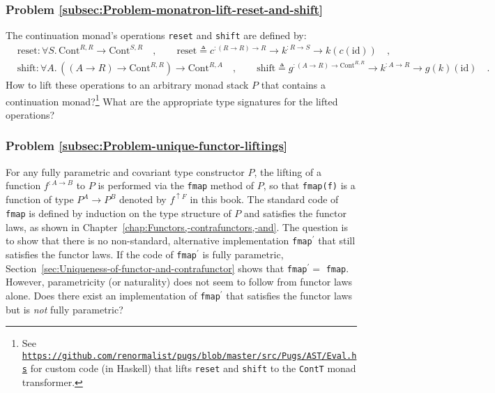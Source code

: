 \subsubsection{Problem \label{subsec:Problem-monatron-lift-reset-and-shift}\ref{subsec:Problem-monatron-lift-reset-and-shift}}

The continuation monad\textsf{'}s operations \lstinline!reset! and \lstinline!shift!
are defined by:
\begin{align*}
 & \text{reset}:\forall S.\,\text{Cont}^{R,R}\rightarrow\text{Cont}^{S,R}\quad,\quad\quad\text{reset}\triangleq c^{:\left(R\rightarrow R\right)\rightarrow R}\rightarrow k^{:R\rightarrow S}\rightarrow k(c(\text{id}))\quad,\\
 & \text{shift}:\forall A.\,((A\rightarrow R)\rightarrow\text{Cont}^{R,R})\rightarrow\text{Cont}^{R,A}\quad,\quad\quad\text{shift}\triangleq g^{:\left(A\rightarrow R\right)\rightarrow\text{Cont}^{R,R}}\rightarrow k^{:A\rightarrow R}\rightarrow g(k)(\text{id})\quad.
\end{align*}
How to lift these operations to an arbitrary monad stack $P$ that
contains a continuation monad?\footnote{See \texttt{\href{https://github.com/renormalist/pugs/blob/master/src/Pugs/AST/Eval.hs}{https://github.com/renormalist/pugs/blob/master/src/Pugs/AST/Eval.hs}}
for custom code (in Haskell) that lifts \lstinline!reset! and \lstinline!shift!
to the \lstinline!ContT! monad transformer.} What are the appropriate type signatures for the lifted operations?

\subsubsection{Problem \label{subsec:Problem-unique-functor-liftings}\ref{subsec:Problem-unique-functor-liftings}}

For any fully parametric and covariant type constructor $P$, the
lifting of a function $f^{:A\rightarrow B}$ to $P$ is performed
via the \lstinline!fmap! method of $P$, so that \lstinline!fmap(f)!
is a function of type $P^{A}\rightarrow P^{B}$ denoted by $f^{\uparrow F}$
in this book. The standard code of \lstinline!fmap! is defined by
induction on the type structure of $P$ and satisfies the functor
laws, as shown in Chapter~\ref{chap:Functors,-contrafunctors,-and}.
The question is to show that there is no non-standard, alternative
implementation \lstinline!fmap!$^{\prime}$ that still satisfies
the functor laws. If the code of \lstinline!fmap!$^{\prime}$ is
fully parametric, Section~\ref{sec:Uniqueness-of-functor-and-contrafunctor}
shows that \lstinline!fmap!$^{\prime}=$ \lstinline!fmap!. However,
parametricity (or naturality) does not seem to follow from functor
laws alone. Does there exist an implementation of \lstinline!fmap!$^{\prime}$
that satisfies the functor laws but is \emph{not} fully parametric?
